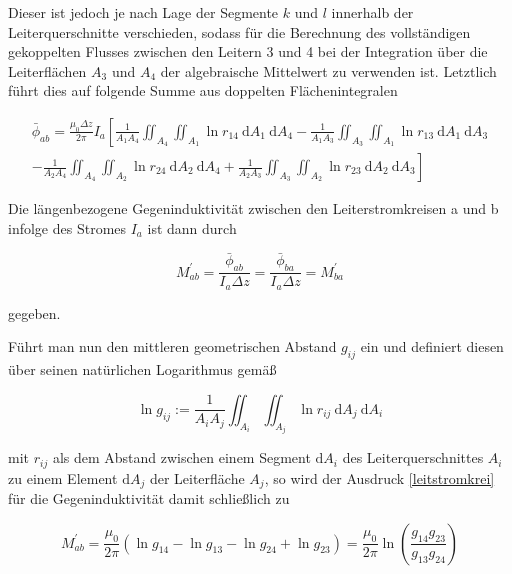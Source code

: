 Dieser ist jedoch je nach Lage der Segmente $k$ und $l$ innerhalb der Leiterquerschnitte verschieden, sodass für die Berechnung des vollständigen gekoppelten Flusses zwischen den Leitern 3 und 4 bei der Integration über die Leiterflächen $A_{3}$ und $A_{4}$ der algebraische Mittelwert zu verwenden ist. Letztlich führt dies auf folgende Summe aus doppelten Flächenintegralen

\begin{equation}
	\begin{array}{r}
		\bar{\phi}_{a b}=\frac{\mu_{0} \Delta z}{2 \pi} I_{a}\left[\frac{1}{A_{1} A_{4}} \iint_{A_{4}} \iint_{A_{1}} \ln r_{14} \mathrm{~d} A_{1} \mathrm{~d} A_{4}-\frac{1}{A_{1} A_{3}} \iint_{A_{3}} \iint_{A_{1}} \ln r_{13} \mathrm{~d} A_{1} \mathrm{~d} A_{3}\right. \\
		\left.-\frac{1}{A_{2} A_{4}} \iint_{A_{4}} \iint_{A_{2}} \ln r_{24} \mathrm{~d} A_{2} \mathrm{~d} A_{4}+\frac{1}{A_{2} A_{3}} \iint_{A_{3}} \iint_{A_{2}} \ln r_{23} \mathrm{~d} A_{2} \mathrm{~d} A_{3}\right] 
	\end{array}
\end{equation}

Die längenbezogene Gegeninduktivität zwischen den Leiterstromkreisen a und b infolge des Stromes $I_{a}$ ist dann durch


\begin{equation}\label{leitstromkrei}
	M_{a b}^{\prime}=\frac{\bar{\phi}_{a b}}{I_{a} \Delta z}=\frac{\bar{\phi}_{b a}}{I_{a} \Delta z}=M_{b a}^{\prime} 
\end{equation}


gegeben.

Führt man nun den mittleren geometrischen Abstand $g_{i j}$ ein und definiert diesen über seinen natürlichen Logarithmus gemäß


\begin{equation}
	\ln g_{i j}:=\frac{1}{A_{i} A_{j}} \iint_{A_{i}} \iint_{A_{j}} \ln r_{i j} \mathrm{~d} A_{j} \mathrm{~d} A_{i} 
\end{equation}


mit $r_{i j}$ als dem Abstand zwischen einem Segment $\mathrm{d} A_{i}$ des Leiterquerschnittes $A_{i}$ zu einem Element $\mathrm{d} A_{j}$ der Leiterfläche $A_{j}$, so wird der Ausdruck \ref{leitstromkrei} für die Gegeninduktivität damit schließlich zu


\begin{equation}\label{gengenindschlieszu}
	M_{a b}^{\prime}=\frac{\mu_{0}}{2 \pi}\left(\ln g_{14}-\ln g_{13}-\ln g_{24}+\ln g_{23}\right)=\frac{\mu_{0}}{2 \pi} \ln \left(\frac{g_{14} g_{23}}{g_{13} g_{24}}\right) 
\end{equation}


